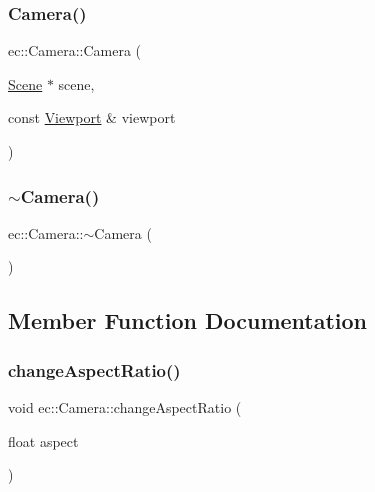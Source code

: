 \mbox{\label{classec_1_1_camera_ab5fa55c91ae586754b613c3e8f33b31c}} 
\subsubsection{\texorpdfstring{Camera()}{Camera()}\hspace{0.1cm}{\footnotesize\ttfamily [2/2]}}
{\footnotesize\ttfamily ec\+::\+Camera\+::\+Camera (\begin{DoxyParamCaption}\item[{\mbox{\hyperlink{classec_1_1_scene}{Scene}} $\ast$}]{scene,  }\item[{const \mbox{\hyperlink{classec_1_1_viewport}{Viewport}} \&}]{viewport }\end{DoxyParamCaption})\hspace{0.3cm}{\ttfamily [explicit]}}

\mbox{\label{classec_1_1_camera_a11d706554e37d6dde0b9313a445cbd4b}} 
\subsubsection{\texorpdfstring{$\sim$\+Camera()}{~Camera()}}
{\footnotesize\ttfamily ec\+::\+Camera\+::$\sim$\+Camera (\begin{DoxyParamCaption}{ }\end{DoxyParamCaption})\hspace{0.3cm}{\ttfamily [default]}}



\subsection{Member Function Documentation}
\mbox{\label{classec_1_1_camera_ae66d4600de35284b8c6846e3dbd9c12d}} 
\subsubsection{\texorpdfstring{change\+Aspect\+Ratio()}{changeAspectRatio()}}
{\footnotesize\ttfamily void ec\+::\+Camera\+::change\+Aspect\+Ratio (\begin{DoxyParamCaption}\item[{float}]{aspect }\end{DoxyParamCaption})}

